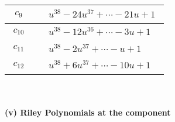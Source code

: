 \documentclass[1p]{elsarticle_modified}
\theoremstyle{definition}
\begin{document}
\begin{tabular}{m{50pt}|m{274pt}}
\hline $$\begin{aligned}c_{9}\end{aligned}$$&$\begin{aligned}
&u^{38}-24 u^{37}+\cdots-21 u+1
\end{aligned}$\\
\hline $$\begin{aligned}c_{10}\end{aligned}$$&$\begin{aligned}
&u^{38}-12 u^{36}+\cdots-3 u+1
\end{aligned}$\\
\hline $$\begin{aligned}c_{11}\end{aligned}$$&$\begin{aligned}
&u^{38}-2 u^{37}+\cdots- u+1
\end{aligned}$\\
\hline $$\begin{aligned}c_{12}\end{aligned}$$&$\begin{aligned}
&u^{38}+6 u^{37}+\cdots-10 u+1
\end{aligned}$\\
\hline
\end{tabular}\\~\\
\newpage\renewcommand{\arraystretch}{1}
\flushleft \textbf{(v) Riley Polynomials at the component}\newline \\
\end{document}
